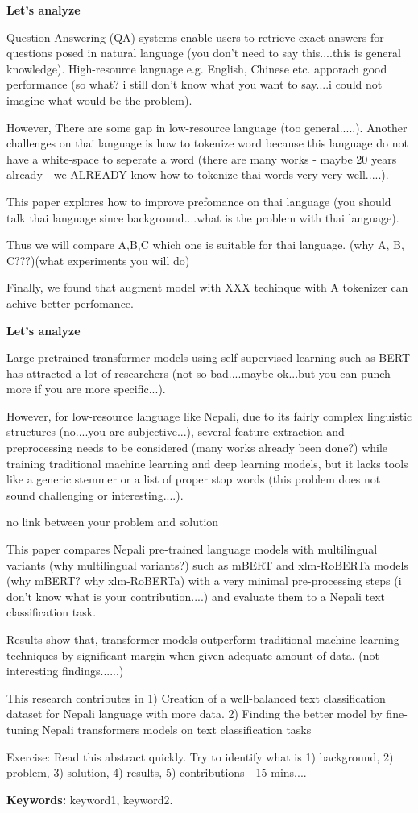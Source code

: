 \textbf{Let's analyze}

Question Answering (QA) systems enable users to retrieve exact answers for questions posed in natural language (you don't need to say this....this is general knowledge). High-resource language e.g. English, Chinese etc. apporach good performance (so what?  i still don't know what you want to say....i could not imagine what would be the problem). 

However, There are some gap in low-resource language (too general.....).   Another challenges on thai language is how to tokenize word because this language do not have a white-space to seperate a word (there are many works - maybe 20 years already - we ALREADY know how to tokenize thai words very very well.....). 

This paper explores how to improve prefomance on thai language (you should talk thai language since background....what is the problem with thai language). 

Thus we will compare A,B,C which one is suitable for thai language.   (why A, B, C???)(what experiments you will do)

Finally, we found that augment model with XXX techinque with A tokenizer can achive better perfomance.

\textbf{Let's analyze}

Large pretrained transformer models using self-supervised learning such as BERT has attracted a lot of researchers (not so bad....maybe ok...but you can punch more if you are more specific...).

However, for low-resource language like Nepali, due to its fairly complex linguistic structures (no....you are subjective...), several feature extraction and preprocessing needs to be considered (many works already been done?) while training traditional machine learning and deep learning models, but it lacks tools like a generic stemmer or a list of proper stop words (this problem does not sound challenging or interesting....).

no link between your problem and solution

This paper compares Nepali pre-trained language models with multilingual variants (why multilingual variants?) such as mBERT and xlm-RoBERTa models (why mBERT? why xlm-RoBERTa) with a very minimal pre-processing steps (i don't know what is your contribution....) and evaluate them to a Nepali text classification task.
	
Results show that, transformer models outperform traditional machine learning techniques by significant margin when given adequate amount of data.    (not interesting findings......)

This research contributes in 1) Creation of a well-balanced text classification dataset for Nepali language with more data. 2) Finding the better model by fine-tuning Nepali transformers models on text classification tasks

Exercise:   Read this abstract quickly.  Try to identify what is 1) background, 2) problem, 3) solution, 4) results, 5) contributions - 15 mins....

\textbf{Keywords:} keyword1, keyword2. 